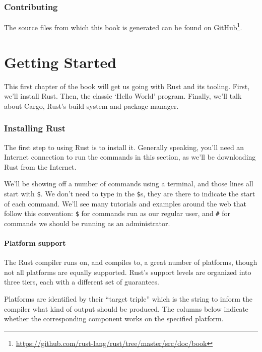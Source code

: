 \documentclass[a4paper,]{book}
\renewcommand{\href}[2]{#2\footnote{\url{#1}}}
\begin{document}
\subsection{Contributing}\label{contributing}

The source files from which this book is generated can be found on
\href{https://github.com/rust-lang/rust/tree/master/src/doc/book}{GitHub}.

\hypertarget{sec--getting-started}{\chapter{Getting
Started}\label{sec--getting-started}}

This first chapter of the book will get us going with Rust and its
tooling. First, we'll install Rust. Then, the classic `Hello World'
program. Finally, we'll talk about Cargo, Rust's build system and
package manager.

\subsection{Installing Rust}\label{installing-rust}

The first step to using Rust is to install it. Generally speaking,
you'll need an Internet connection to run the commands in this section,
as we'll be downloading Rust from the Internet.

We'll be showing off a number of commands using a terminal, and those
lines all start with \texttt{\$}. We don't need to type in the
\texttt{\$}s, they are there to indicate the start of each command.
We'll see many tutorials and examples around the web that follow this
convention: \texttt{\$} for commands run as our regular user, and
\texttt{\#} for commands we should be running as an administrator.

\subsubsection{Platform support}\label{platform-support}

The Rust compiler runs on, and compiles to, a great number of platforms,
though not all platforms are equally supported. Rust's support levels
are organized into three tiers, each with a different set of guarantees.

Platforms are identified by their ``target triple'' which is the string
to inform the compiler what kind of output should be produced. The
columns below indicate whether the corresponding component works on the
specified platform.
\end{document}

